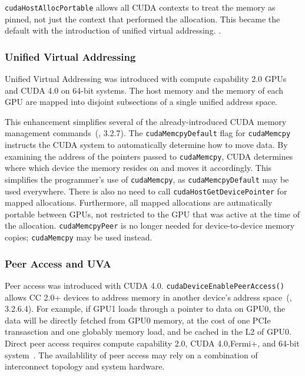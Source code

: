 \texttt{cudaHostAllocPortable} allows all CUDA contexts to treat the memory as pinned, not just the context that performed the allocation.
This became the default with the introduction of unified virtual addressing. .

\subsubsection{Unified Virtual Addressing}
\label{sec:uva}

Unified Virtual Addressing was introduced with compute capability 2.0 GPUs and CUDA 4.0 on 64-bit systems.
The host memory and the memory of each GPU are mapped into disjoint subsections of a single unified address space.

This enhancement simplifies several of the already-introduced CUDA memory management commands~(\cite{nvidia2011cudac40}, 3.2.7).
The \texttt{cudaMemcpyDefault} flag for \texttt{cudaMemcpy} instructs the CUDA system to automatically determine how to move data.
By examining the address of the pointers passed to \texttt{cudaMemcpy}, CUDA determines where which device the memory resides on and moves it accordingly.
This simplifies the programmer's use of \texttt{cudaMemcpy}, as \texttt{cudaMemcpyDefault} may be used everywhere.
There is also no need to call \texttt{cudaHostGetDevicePointer} for mapped allocations.
Furthermore, all mapped allocations are autmatically portable between GPUs, not restricted to the GPU that was active at the time of the allocation.
\texttt{cudaMemcpyPeer} is no longer needed for device-to-device memory copies; \texttt{cudaMemcpy} may be used instead.

\subsubsection{Peer Access and UVA}
\label{sec:cuda-peer}

Peer access was introduced with CUDA 4.0.
\texttt{cudaDeviceEnablePeerAccess()} allows CC 2.0+ devices to address memory in another device's address space~(\cite{nvidia2011cudac40}, 3.2.6.4).
For example, if GPU1 loads through a pointer to data on GPU0, the data will be directly fetched from GPU0 memory, at the cost of one PCIe transasction and one globably memory load, and be cached in the L2 of GPU0.
Direct peer access requires compute capability 2.0, CUDA 4.0,Fermi+, and 64-bit system~\cite{schroeder2011peer}.
The availablility of peer access may rely on a combination of interconnect topology and system hardware.

